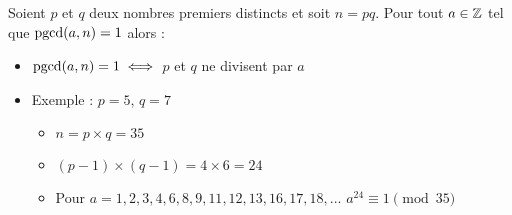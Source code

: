 \begin{frame}

\begin{theoreme}
Soient $p$ et $q$ deux nombres premiers distincts et soit $n = p q$. Pour tout
$a\in \mathbb{Z}$ tel que $\mathop{\text{pgcd}}\nolimits(a,n)=1$ alors :
\end{theoreme}

\pause
\bigskip

\begin{itemize}
  \item $\mathop{\text{pgcd}}\nolimits(a,n)=1 \iff $ $p$ et $q$ ne divisent par $a$

  \pause
  \item Exemple : $p=5$, $q=7$
  \begin{itemize}
    \item $n = p \times q=35$
    \item $%
 (p-1)\times (q-1) =4\times 6 = 24$
    \item Pour $a\!=\!1,2,3,4,6,8,9,11,12,13,16,17,18,...$ \quad $a^{24}\! \equiv \!1 \!\pmod{\!35}$
  \end{itemize}
 
\end{itemize}
\end{frame}


